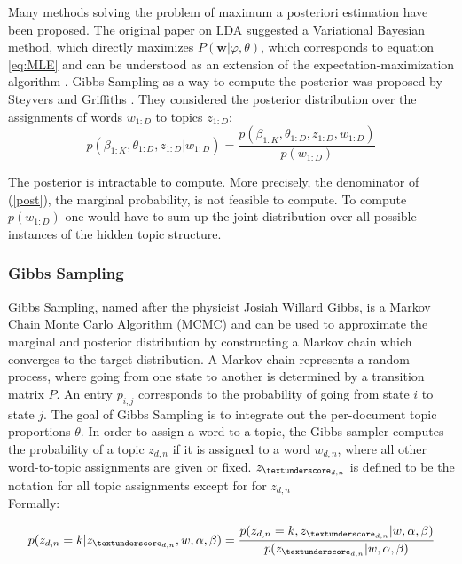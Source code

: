 \documentclass[a4paper,ngerman, english]{atseminar}
\begin{document}
Many methods solving the problem of maximum a posteriori estimation have been proposed. The original paper on LDA \cite{blei2003latent} suggested a Variational Bayesian method, which directly maximizes $P(\boldsymbol{w} | \varphi, \theta)$, which corresponds to equation \ref{eq:MLE} and can be understood as an extension of the expectation-maximization algorithm \cite{fox2012tutorial}. Gibbs Sampling as a way to compute the
posterior was proposed by Steyvers and Griffiths \cite{steyvers2007probabilistic}. They considered the posterior distribution
over the assignments of words $w_{1:D}$ to topics $z_{1:D}$: \\

\begin{equation} \label{post}
p(\beta_{1:K}, \theta_{1:D}, z_{1:D} | w_{1:D} ) = \frac{p(\beta_{1:K}, \theta_{1:D}, z_{1:D},w_{1:D} )}{p(w_{1:D})}
\end{equation}

The posterior is intractable to compute. More precisely, the denominator of (\autoref{post}), the marginal probability, is not feasible to 
compute. To compute $p(w_{1:D})$ one would have to sum up the joint distribution over all possible instances of the hidden topic structure.



\subsubsection{Gibbs Sampling} \label{sec:gibbs}

Gibbs Sampling, named after the physicist Josiah Willard Gibbs, is a Markov Chain Monte Carlo Algorithm (MCMC) and can be used to approximate the marginal and posterior 
distribution by constructing a Markov chain which converges to the target distribution.
A Markov chain represents a random process, where going from one state to another is determined by a transition matrix $P$.
An entry $p_{i,j}$ corresponds to the probability of going from state $i$ to state $j$.
The goal of Gibbs Sampling is to integrate out the per-document topic proportions $\theta$.
\noindent
In order to assign a word to a topic, the Gibbs sampler computes the probability of a topic $z_{d,n}$ if it is assigned to a word $w_{d,n}$, where 
all other word-to-topic assignments are given or fixed. $z_{\textunderscore_ {d,n}}$ is defined to be the notation for all topic assignments except 
for for $z_{d,n}$ \\
Formally:

\begin{equation} \label{eq:gibbs}
p(z_{d,n} = k | z_{\textunderscore_ {d,n}},w,\alpha, \beta) = \frac{p(z_{d,n}=k, z_{\textunderscore_ {d,n}} | w, \alpha, \beta)}{p(z_{\textunderscore_ {d,n}} | w,\alpha, \beta)}
\end{equation}
\end{document}
